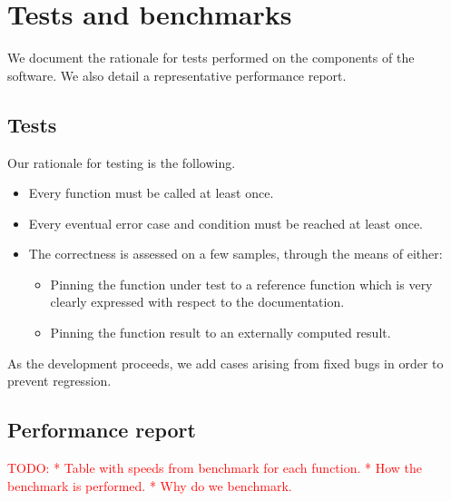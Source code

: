 \section{Tests and benchmarks}
We document the rationale for tests performed on the components of the
software. We also detail a representative performance report.

\subsection{Tests}
Our rationale for testing is the following.

\begin{itemize}
\item Every function must be called at least once.
\item Every eventual error case and condition must be reached at least once.
\item The correctness is assessed on a few samples, through the means of
      either:
  \begin{itemize}
  \item Pinning the function under test to a reference function which
        is very clearly expressed with respect to the documentation.
  \item Pinning the function result to an externally computed result.
  \end{itemize}
\end{itemize}

As the development proceeds, we add cases arising from fixed bugs in order to
prevent regression.

\subsection{Performance report}
\textcolor{red}
{TODO: * Table with speeds from benchmark for each function.
       * How the benchmark is performed.
       * Why do we benchmark.}

